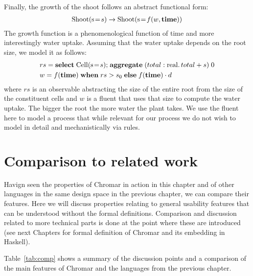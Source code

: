 Finally, the growth of the shoot follows an abstract functional form:
\begin{align*}
\mathrm{Shoot}(\mathrm{s} \! = \! {s}) \xrightarrow{} \mathrm{Shoot}(\mathrm{s} \! = \! {f(w, \mathbf{time})})
\end{align*}
The growth function is a phenomenological function of time and more
interestingly water uptake. Assuming that the water uptake depends on the root
size, we model it as follows:
\begin{align*}
& rs  = \mathbf{select} \; \mathrm{Cell}(\mathrm{s} \! = \! {s}) \mathbf{;} \; \mathbf{aggregate} \;
                                                              (total:
                                                              \mathrm{real}.\,
                                                              total + s) \; 0 \\
& w = f(\mathbf{time}) \; \mathbf{when} \; rs > s_0 \; \mathbf{else} \;
f(\mathbf{time}) \cdot d                                       
\end{align*}
where $rs$ is an observable abstracting the size of the entire root from the
size of the constituent cells and $w$ is a fluent that uses that size to compute
the water uptake. The bigger the root the more water the plant takes. We use the
fluent here to model a process that while relevant for our process we do not
wish to model in detail and mechanistically via rules.

\section{Comparison to related work}
Havign seen the properties of Chromar in action in this chapter and of other
languages in the same design space in the previous chapter, we can compare their
features. Here we will discuss properties relating to general usability features
that can be understood without the formal definitions. Comparison and discussion
related to more technical parts is done at the point where these are introduced
(see next Chapters for formal definition of Chromar and its embedding in
Haskell).

Table~\ref{tab:comp} shows a summary of the discussion points and a comparison
of the main features of Chromar and the languages from the previous chapter.

